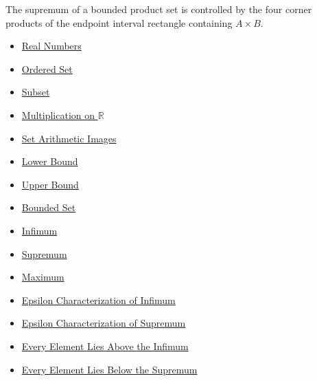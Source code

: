 \begin{remark*}[Interpretation]
The supremum of a bounded product set is controlled by the four corner
products of the endpoint interval rectangle containing $A\times B$.
\end{remark*}

\begin{dependencies}
\begin{itemize}
  \item \hyperref[def:reals]{Real Numbers}
  \item \hyperref[def:ordered-set]{Ordered Set}
  \item \hyperref[def:subset]{Subset}
  \item \hyperref[def:multiplication-on-r]{Multiplication on $\mathbb{R}$}
  \item \hyperref[def:set-arithmetic-images]{Set Arithmetic Images}
  \item \hyperref[def:real-lower-bound]{Lower Bound}
  \item \hyperref[def:real-upper-bound]{Upper Bound}
  \item \hyperref[def:bounded]{Bounded Set}
  \item \hyperref[def:infimum]{Infimum}
  \item \hyperref[def:supremum]{Supremum}
  \item \hyperref[def:maximum]{Maximum}
  \item \hyperref[def:epsilon-characterization-of-infimum]{Epsilon Characterization of Infimum}
  \item \hyperref[def:epsilon-characterization-of-supremum]{Epsilon Characterization of Supremum}
  \item \hyperref[prop:every-element-lies-above-the-infimum]{Every Element Lies Above the Infimum}
  \item \hyperref[prop:every-element-lies-below-the-supremum]{Every Element Lies Below the Supremum}
\end{itemize}
\end{dependencies}

